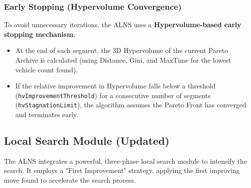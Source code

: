 \documentclass[a4paper,12pt]{article}
\begin{document}
\subsubsection{Early Stopping (Hypervolume Convergence)}
To avoid unnecessary iterations, the ALNS uses a \textbf{Hypervolume-based early stopping mechanism}:
\begin{itemize}
    \item At the end of each segment, the 3D Hypervolume of the current Pareto Archive is calculated (using Distance, Gini, and MaxTime for the lowest vehicle count found).
    \item If the relative improvement in Hypervolume falls below a threshold (\texttt{hvImprovementThreshold}) for a consecutive number of segments (\texttt{hvStagnationLimit}), the algorithm assumes the Pareto Front has converged and terminates early.
\end{itemize}

\subsection{Local Search Module (Updated)}
The ALNS integrates a powerful, three-phase local search module to intensify the search. It employs a "First Improvement" strategy, applying the first improving move found to accelerate the search process.
\end{document}
